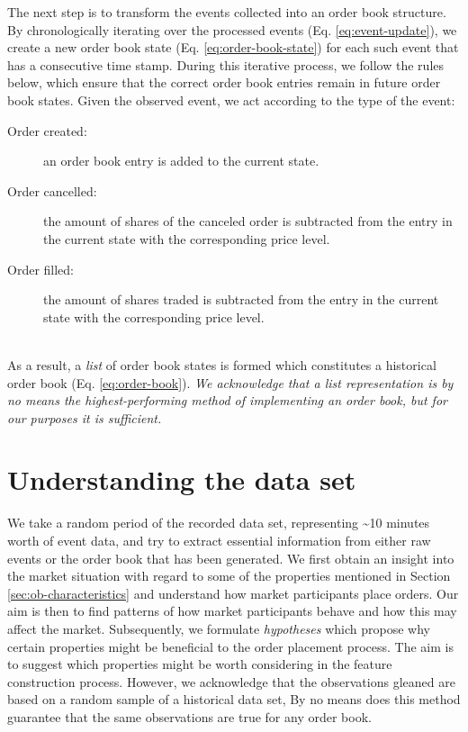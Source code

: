 The next step is to transform the events collected into an order book structure.
By chronologically iterating over the processed events (Eq. \ref{eq:event-update}), we create a new order book state (Eq. \ref{eq:order-book-state}) for each such event that has a consecutive time stamp.
During this iterative process, we follow the rules below, which ensure that the correct order book entries remain in future order book states.
Given the observed event, we act according to the type of the event:
\begin{description}
    \item[Order created:] an order book entry is added to the current state.
    \item[Order cancelled:] the amount of shares of the canceled order is subtracted from the entry in the current state with the corresponding price level.
    \item[Order filled:] the amount of shares traded is subtracted from the entry in the current state with the corresponding price level.
\end{description}
\hfill
\\
As a result, a \textit{list} of order book states is formed which constitutes a historical order book (Eq. \ref{eq:order-book}).
\textit{We acknowledge that a list representation is by no means the highest-performing method of implementing an order book, but for our purposes it is sufficient.}

\vfill

\section{Understanding the data set}
\label{sec:data-hypotheses}

We take a random period of the recorded data set, representing \textasciitilde10 minutes worth of event data, and try to extract essential information from either raw events or the order book that has been generated.
We first obtain an insight into the market situation with regard to some of the properties mentioned in Section \ref{sec:ob-characteristics} and understand how market participants place orders.
Our aim is then to find patterns of how market participants behave and how this may affect the market.
Subsequently, we formulate \textit{hypotheses} which propose why certain properties might be beneficial to the order placement process. The aim is to suggest which properties might be worth considering in the feature construction process.  However, we acknowledge that the observations gleaned are based on a random sample of a historical data set,
By no means does this method guarantee that the same observations are true for any order book.

